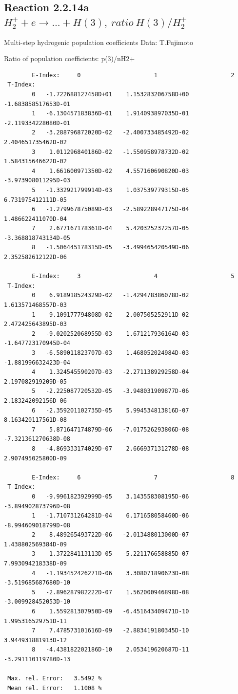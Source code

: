 \documentclass[12pt,dvips]{article}
\begin{document}
\newpage
\subsection{
Reaction 2.2.14a $ H_2^+ + e \rightarrow ...+ H(3) , \   ratio  ~ H(3)/H_2^+ $
}

 Multi-step hydrogenic population coefficients
 Data: T.Fujimoto

 Ratio of population coefficients: p(3)/nH2+


\begin{small}\begin{verbatim}
        E-Index:     0                     1                     2
 T-Index:
        0   -1.722688127458D+01    1.153283206758D+00   -1.683858517653D-01
        1   -6.130457183836D-01    1.914093897035D-01   -2.119334228080D-01
        2   -3.288796872020D-02   -2.400733485492D-02    2.404651735462D-02
        3    1.011296840186D-02   -1.550958978732D-02    1.584315646622D-02
        4    1.661600971350D-02    4.557160690820D-03   -3.973908011295D-03
        5   -1.332921799914D-03    1.037539779315D-05    6.731975412111D-05
        6   -1.279967875089D-03   -2.589228947175D-04    1.486622411070D-04
        7    2.677167178361D-04    5.420325237257D-05   -3.368818743134D-05
        8   -1.506445178315D-05   -3.499465420549D-06    2.352582612122D-06

        E-Index:     3                     4                     5
 T-Index:
        0    6.918918524329D-02   -1.429478386078D-02    1.613571468557D-03
        1    9.109177794808D-02   -2.007505252911D-02    2.472425643895D-03
        2   -9.020252068955D-03    1.671217936164D-03   -1.647723170945D-04
        3   -6.589011823707D-03    1.468052024984D-03   -1.881996632423D-04
        4    1.324545590207D-03   -2.271138929258D-04    2.197082919209D-05
        5   -2.225087720532D-05   -3.948031909877D-06    2.183242092156D-06
        6   -2.359201102735D-05    5.994534813816D-07    8.163420117561D-08
        7    5.871647174879D-06   -7.017526293806D-08   -7.321361270638D-08
        8   -4.869333174029D-07    2.666937131278D-08    2.907495025800D-09

        E-Index:     6                     7                     8
 T-Index:
        0   -9.996182392999D-05    3.143558308195D-06   -3.894902873796D-08
        1   -1.710731264281D-04    6.171658058460D-06   -8.994609018799D-08
        2    8.489265493722D-06   -2.013488013000D-07    1.438802569384D-09
        3    1.372284113113D-05   -5.221176658885D-07    7.993094218338D-09
        4   -1.193452426271D-06    3.308071890623D-08   -3.519685687680D-10
        5   -2.896287982222D-07    1.562000946898D-08   -3.009928452053D-10
        6    1.559281307950D-09   -6.451643409471D-10    1.995316529751D-11
        7    7.478573101616D-09   -2.883419180345D-10    3.944931881913D-12
        8   -4.438182202186D-10    2.053419620687D-11   -3.291110119780D-13

 Max. rel. Error:   3.5492 %
 Mean rel. Error:   1.1008 %


\end{verbatim}\end{small}
\end{document}
